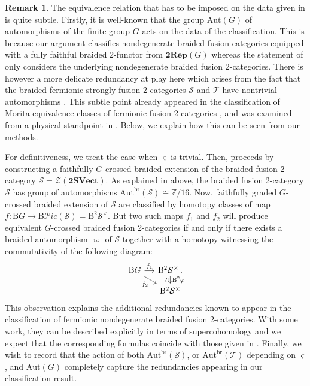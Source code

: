 \documentclass[11pt,reqno]{amsart}
\DeclareMathOperator{\br}{br}
\newcommand{\sPic}{\mathscr{P}ic}
\numberwithin{equation}{section}
\theoremstyle{plain}
\theoremstyle{definition}
\newtheorem{rem}[equation]{Remark}
\begin{document}
\begin{rem}\label{rem:redundancies}
The equivalence relation that has to be imposed on the data given in  is quite subtle.
Firstly, it is well-known that the group $\mathrm{Aut}(G)$ of automorphisms of the finite group $G$ acts on the data of the classification.
This is because our argument classifies nondegenerate braided fusion categories equipped with a fully faithful braided 2-functor from $\mathbf{2Rep}(G)$ whereas the statement of  only considers the underlying nondegenerate braided fusion 2-categories.
There is however a more delicate redundancy at play here which arises from the fact that the braided fermionic strongly fusion 2-categories $\mathcal{S}$ and $\mathcal{T}$ have nontrivial automorphisms \cite{JF2,JFR}.
This subtle point already appeared in the classification of Morita equivalence classes of fermionic fusion 2-categories \cite{D9}, and was examined from a physical standpoint in \cite{Teixeira:2025qsg}.
Below, we explain how this can be seen from our methods.

For definitiveness, we treat the case when $\varsigma$ is trivial.
Then,  proceeds by constructing a faithfully $G$-crossed braided extension of the braided fusion 2-category $\mathcal{S}=\mathcal{Z}(\mathbf{2SVect})$.
As explained in  above, the braided fusion 2-category $\mathcal{S}$ has group of automorphisms $\mathrm{Aut}^{\br}(\mathcal{S})\cong\mathbb{Z}/16$.
Now, faithfully graded $G$-crossed braided extension of $\mathcal{S}$ are classified by homotopy classes of map $f:\mathrm{B}G\rightarrow \mathrm{B}\sPic(\mathcal{S})=\mathrm{B}^2\mathcal{S}^{\times}$.
But two such maps $f_1$ and $f_2$ will produce equivalent $G$-crossed braided fusion 2-categories if and only if there exists a braided automorphism $\varpi$ of $\mathcal{S}$ together with a homotopy witnessing the commutativity of the following diagram:
\begin{equation}
\begin{tikzcd}[sep=small]
\mathrm{B}G \arrow[r, "f_1"] \arrow[rd, "f_2"'] & \mathrm{B}^2\mathcal{S}^{\times}\,. \arrow[d, "\mathrm{B}^2\varphi", "\rotatebox{90}{$\simeq$}"'] \\
& \mathrm{B}^2\mathcal{S}^{\times}
\end{tikzcd}
\end{equation}
This observation explains the additional redundancies known to appear in the classification of fermionic nondegenerate braided fusion 2-categories.
With some work, they can be described explicitly in terms of supercohomology and we expect that the corresponding formulas coincide with those given in \cite[Theorem 2.9]{Teixeira:2025qsg}.
Finally, we wish to record that the action of both $\mathrm{Aut}^{\br}(\mathcal{S})$, or $\mathrm{Aut}^{\br}(\mathcal{T})$ depending on $\varsigma$, and $\mathrm{Aut}(G)$ completely capture the redundancies appearing in our classification result.
\end{rem}
\end{document}
